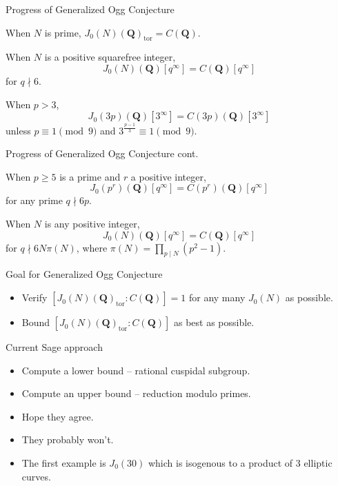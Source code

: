 \documentclass{beamer}
\newcommand{\QQ}{\mathbf{Q}}
\newcommand{\tor}{\mathrm{tor}}
\begin{document}
\begin{frame}{Progress of Generalized Ogg Conjecture}
    \begin{theorem}[Mazur '77]
        When $N$ is prime, $J_0(N)(\QQ)_\tor =C(\QQ)$.
    \end{theorem}
    \begin{theorem}[Ohta '14]
        When $N$ is a positive squarefree integer,
        \[
            J_0(N)(\QQ)[q^\infty]=C(\QQ)[q^\infty]
        \]
        for $q\nmid 6$.
    \end{theorem}
    \begin{theorem}[Yoo '15]
        When $p>3$,
        \[
            J_0(3p)(\QQ)[3^\infty] = C(3p)(\QQ)[3^\infty]
        \]
        unless $p\equiv 1 \pmod{9}$ and $3^{\frac{p-1}{3}} \equiv 1
        \pmod{9}$.
    \end{theorem}
\end{frame}

\begin{frame}{Progress of Generalized Ogg Conjecture cont.}
    \begin{theorem}[Ling '97]
        When $p\geq 5$ is a prime and $r$ a positive integer,
        \[
            J_0(p^r)(\QQ)[q^\infty] = C(p^r)(\QQ)[q^\infty]
        \]
        for any prime $q\nmid 6p$.
    \end{theorem}
    \begin{theorem}[Ren '18]
        When $N$ is any positive integer,
        \[
            J_0(N)(\QQ)[q^\infty]=C(\QQ)[q^\infty]
        \]
        for $q\nmid 6N\pi(N)$, where $\pi(N) = \prod_{p\mid N}
        (p^2-1)$.
    \end{theorem}
\end{frame}

\begin{frame}{Goal for Generalized Ogg Conjecture}
    \begin{itemize}
        \item
            Verify $[J_0(N)(\QQ)_\tor:C(\QQ)]=1$ for any many $J_0(N)$ as
            possible.
        \item
            Bound $[J_0(N)(\QQ)_\tor:C(\QQ)]$ as best as possible.
    \end{itemize}
\end{frame}

\begin{frame}{Current Sage approach}
    \begin{itemize}
        \item
            Compute a lower bound -- rational cuspidal subgroup.
        \item
            Compute an upper bound -- reduction modulo primes.
        \item
            Hope they agree.
        \item
            They probably won't.
        \item
            The first example is $J_0(30)$ which is
            isogenous to a product of 3 elliptic curves.
    \end{itemize}
\end{frame}
\end{document}
